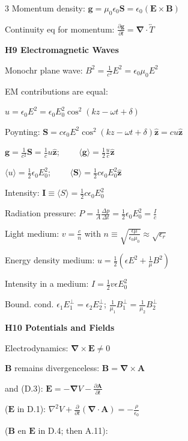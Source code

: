 \documentclass[a4paper,twoside]{article}
\newcommand{\secblock}[1]{%
\par\vspace{1.8pt}%
\noindent\colorbox{hdrcol}{\parbox[c][1.0em][c]{0.98\linewidth}{\color{white}\bfseries\small #1}}\par
\vspace{1pt}%
}
\begin{document}
\begin{multicols*}{3}
Momentum density:
\(\bm g =  \mu_0 \epsilon_0 \bm S = \epsilon_0 (\bm E \times \bm B)\)


Continuity eq for momentum:
\(\frac{\partial \bm g}{\partial t} = \bm \nabla \cdot \overleftrightarrow{T} \)


\secblock{H9 Electromagnetic Waves}


Monochr plane wave:
\(B^2 = \frac{1}{c^2} E^2 = \epsilon_0 \mu_0 E^2\)

EM contributions are equal:

\(u = \epsilon_0 E^2 = \epsilon_0 E_0^2 \cos^2(k z - \omega t + \delta)\)

Poynting:
\(\bm S = c \epsilon_0 E^2 \cos^2(k z - \omega t + \delta) \hat{\bm z} = c u \hat{\bm z}\)

\(\bm g = \frac{1}{c^2} \bm S = \frac{1}{c} u \hat{\bm z}\);
\(\qquad \langle \bm g \rangle = \frac{1}{2} \frac{u}{c} \hat{\bm z}\)

\(\langle u \rangle = \frac{1}{2} \epsilon_0 E_0^2\);
\(\qquad \langle \bm S \rangle = \frac{1}{2} c \epsilon_0 E_0^2 \hat{\bm z}\)

Intensity: \(\bm I \equiv \langle  S \rangle = \frac{1}{2} c \epsilon_0 E_0^2 \)

Radiation pressure:
\(P = \frac{1}{A}\frac{\Delta p}{\Delta t} = \frac{1}{2}\epsilon_0 E_0^2 =\frac{I}{c}\)

Light medium:
\(v = \frac{c}{n}\)
with \(n \equiv \sqrt{\frac{\epsilon \mu}{\epsilon_0 \mu_0}} \approx \sqrt{\epsilon_r}\)

Energy density medium:
\(u = \frac{1}{2} (\epsilon E^2 + \frac{1}{\mu} B^2)\)

Intensity in a medium:
\(I = \frac{1}{2} v \epsilon E_0^2 \)

Bound. cond.
\(\epsilon_1 E_1^{\perp} = \epsilon_2 E_2^{\perp}\);
\(\frac{1}{\mu_1} B_1^{\perp} = \frac{1}{\mu_2} B_2^{\perp}\)

\secblock{H10 Potentials and Fields}

Electrodynamics: \(\bm \nabla \times \bm E \neq 0\)

\(\bm B\) remains divergenceless:
\(\bm B = \bm \nabla \times \bm A\)

and (D.3): \(\bm E = - \bm \nabla V - \frac{\partial \bm A}{\partial t}\)

(\(\bm E\) in D.1):
\(\nabla^2 V + \frac{\partial }{\partial t}(\bm \nabla \cdot \bm A) = -\frac{\rho}{\epsilon_0}\)

(\(\bm B\) en \(\bm E\) in D.4; then A.11):


\end{multicols*}
\end{document}
